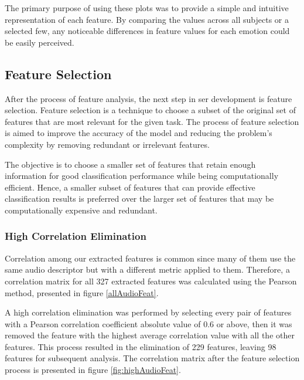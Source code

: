The primary purpose of using these plots was to provide a simple and intuitive representation of each feature. By comparing the values across all subjects or a selected few, any noticeable differences in feature values for each emotion could be easily perceived.

\subsection{Feature Selection}

After the process of feature analysis, the next step in \ac{ser} development is feature selection. Feature selection is a technique to choose a subset of the original set of features that are most relevant for the given task. The process of feature selection is aimed to improve the accuracy of the model and reducing the problem's complexity by removing redundant or irrelevant features. 

The objective is to choose a smaller set of features that retain enough information for good classification performance while being computationally efficient. Hence, a smaller subset of features that can provide effective classification results is preferred over the larger set of features that may be computationally expensive and redundant.

\subsubsection{High Correlation Elimination}

Correlation among our extracted features is common since many of them use the same audio descriptor but with a different metric applied to them. Therefore, a correlation matrix for all 327 extracted features was calculated using the Pearson method, presented in figure \ref{allAudioFeat}.

A high correlation elimination was performed by selecting every pair of features with a Pearson correlation coefficient absolute value of 0.6 or above, then it was removed the feature with the highest average correlation value with all the other features. This process resulted in the elimination of 229 features, leaving 98 features for subsequent analysis. The correlation matrix after the feature selection process is presented in figure \ref{fig:highAudioFeat}.

